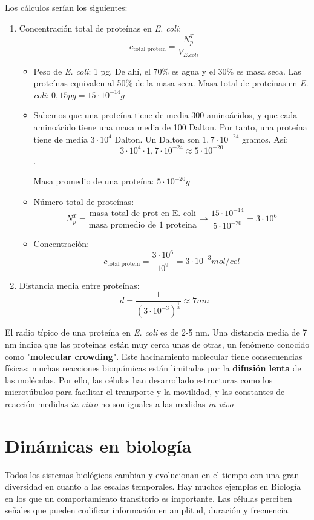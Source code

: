 Los cálculos serían los siguientes:
\begin{enumerate}
\item Concentración total de proteínas en \textit{E. coli}:
$$c_{\text{total protein}} = \frac{N^T_p}{V_{E.coli}}$$
\begin{itemize}
\item Peso de \textit{E. coli}: 1 pg. De ahí, el 70\% es agua y el 30\% es masa seca. Las proteínas equivalen al 50\% de la masa seca. Masa total de proteínas en \textit{E. coli}: $0,15 pg = 15 \cdot 10^{-14} g$
\item Sabemos que una proteína tiene de media 300 aminoácidos, y que cada aminoácido tiene una masa media de 100 Dalton. Por tanto, una proteína tiene de media  $3 \cdot 10^4$ Dalton. Un Dalton son $1,7 \cdot 10^{-24}$ gramos. Así:
$$3\cdot 10^4 \cdot 1,7 \cdot 10^{-24} \approx 5 \cdot 10^{-20}$$. 

Masa promedio de una proteína: $5 \cdot 10^{-20} g$

\item Número total de proteínas:
$$N^T_p = \frac{\text{masa total de prot en E. coli}}{\text{masa promedio de 1 proteina}} \rightarrow \frac{15 \cdot 10^{-14}}{5 \cdot 10^{-20}} = 3 \cdot 10^6$$
\item Concentración:
$$c_{\text{total protein}} = \frac{3 \cdot 10^6}{10^9} = 3 \cdot 10^{-3} mol/cel$$
\end{itemize}
\item Distancia media entre proteínas:
$$d = \frac{1}{(3 \cdot 10^{-3})^{\frac{1}{3}}} \approx 7nm$$
\end{enumerate}

El radio típico de una proteína en \textit{E. coli} es de 2-5 nm. Una distancia media de 7 nm indica que las proteínas están muy cerca unas de otras, un fenómeno conocido como "\textbf{molecular crowding}".
Este hacinamiento molecular tiene consecuencias físicas: muchas reacciones bioquímicas están limitadas por la \textbf{difusión lenta} de las moléculas. Por ello, las células han desarrollado estructuras como los microtúbulos para facilitar el transporte y la movilidad, y las constantes de reacción medidas \textit{in vitro} no son iguales a las medidas \textit{in vivo}

\section{Dinámicas en biología}
Todos los sistemas biológicos cambian y evolucionan en el tiempo con una gran diversidad en cuanto a las escalas temporales.
Hay muchos ejemplos en Biología en los que un comportamiento transitorio es importante. Las células perciben señales que pueden codificar información en amplitud, duración y frecuencia.

